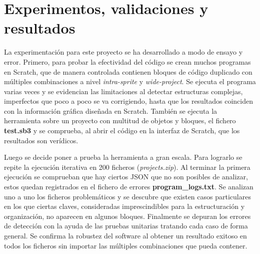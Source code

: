 \documentclass[a4paper, 12pt]{book}
\begin{document}



\cleardoublepage
\chapter{Experimentos, validaciones y resultados}


La experimentación para este proyecto se ha desarrollado a modo de ensayo y error. Primero, para probar la efectividad del código se crean muchos programas en Scratch, que de manera controlada contienen bloques de código duplicado con múltiples combinaciones a nivel \textit{intra-sprite} y \textit{wide-project}. Se ejecuta el programa varias veces y se evidencian las limitaciones al detectar estructuras complejas, imperfectos que poco a poco se va corrigiendo, hasta que los resultados coinciden con la información gráfica diseñada en Scratch. También se ejecuta la herramienta sobre un proyecto con multitud de objetos y bloques, el fichero \textbf{test.sb3} y se comprueba, al abrir el código en la interfaz de Scratch, que los resultados son verídicos.

Luego se decide poner a prueba la herramienta a gran escala. Para lograrlo se repite la ejecución iterativa en 200 ficheros (\textit{projects.zip}). Al terminar la primera ejecución se comprueban que hay ciertos JSON que no son posibles de analizar, estos quedan registrados en el fichero de errores \textbf{program\_logs.txt}. Se analizan uno a uno los ficheros problemáticos y se descubre que existen casos particulares en los que ciertas claves, consideradas imprescindibles para la estructuración y organización, no aparecen en algunos bloques. Finalmente se depuran los errores de detección con la ayuda de las pruebas unitarias tratando cada caso de forma general. Se confirma la robustez del software al obtener un resultado exitoso en todos los ficheros sin importar las múltiples combinaciones que pueda contener.
\end{document}
